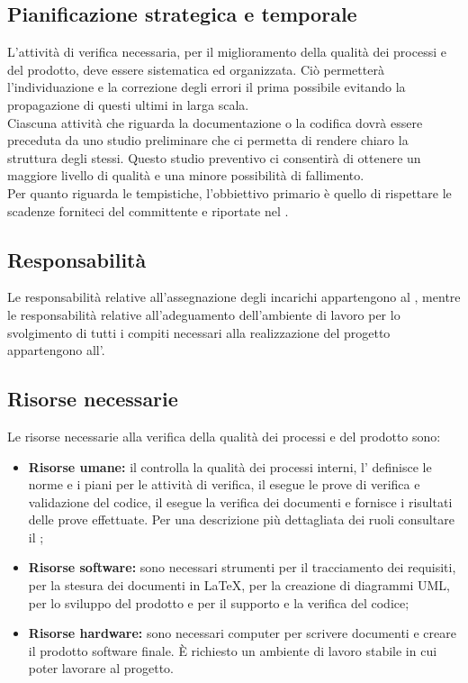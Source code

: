 	\subsection{Pianificazione strategica e temporale}
	L'attività di verifica necessaria, per il miglioramento della qualità dei processi e del prodotto, deve essere sistematica ed organizzata. Ciò permetterà l'individuazione e la correzione degli errori il prima possibile evitando la propagazione di questi ultimi in larga scala.\\
	Ciascuna attività che riguarda la documentazione o la codifica dovrà essere preceduta da uno studio preliminare che ci permetta di rendere chiaro la struttura degli stessi. Questo studio preventivo ci consentirà di ottenere un maggiore livello di qualità e una minore possibilità di fallimento. \\
	Per quanto riguarda le tempistiche, l'obbiettivo primario è quello di rispettare le scadenze forniteci del committente\gloss{} e riportate nel \docNameVersionPdP.
	
	\subsection{Responsabilità}
	Le responsabilità relative all'assegnazione degli incarichi appartengono al \roleProjectManager, mentre le responsabilità relative all'adeguamento dell'ambiente di lavoro per lo svolgimento di tutti i compiti necessari alla realizzazione del progetto appartengono all'\roleAdministrator.

	\subsection{Risorse necessarie}
	Le risorse necessarie alla verifica della qualità dei processi e del prodotto sono:
		\begin{itemize}
  			\item \textbf{Risorse umane:} \textnormal{il \roleProjectManager{} controlla la qualità dei processi interni, l'\roleAdministrator{} definisce le norme e i piani per le attività di verifica, il \roleProgrammer{} esegue le prove di verifica e validazione\gloss{} del codice, il \roleVerifier{} esegue la verifica dei documenti e fornisce i risultati delle prove effettuate. Per una descrizione più dettagliata dei ruoli consultare il \docNameVersionPdP;}
  			\item \textbf{Risorse software:} \textnormal{sono necessari strumenti per il tracciamento dei requisiti, per la stesura dei documenti in \LaTeX, per la creazione di diagrammi UML\gloss{}, per lo sviluppo del prodotto e per il supporto e la verifica del codice;}
  			\item \textbf{Risorse hardware:} \textnormal{sono necessari computer per scrivere documenti e creare il prodotto software finale. \`E richiesto un ambiente di lavoro stabile in cui poter lavorare al progetto.}
		\end{itemize}

